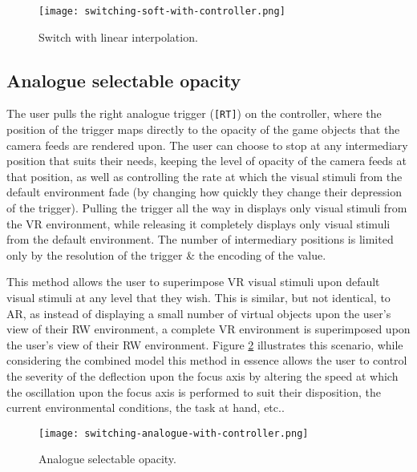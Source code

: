 \begin{figure}[h]
	\begin{center}
		\texttt{[image: switching-soft-with-controller.png]}
		\caption{Switch with linear interpolation.}
		\label{scenario12}
	\end{center}
\end{figure}


\subsection{Analogue selectable opacity}
\label{analogue-selectable-opacity}
The user pulls the right analogue trigger (\texttt{[RT]}) on the controller, where the position of the trigger maps directly to the opacity of the game objects that the camera feeds are rendered upon. The user can choose to stop at any intermediary position that suits their needs, keeping the level of opacity of the camera feeds at that position, as well as controlling the rate at which the visual stimuli from the default environment fade (by changing how quickly they change their depression of the trigger). Pulling the trigger all the way in displays only visual stimuli from the VR environment, while releasing it completely displays only visual stimuli from the default environment. The number of intermediary positions is limited only by the resolution of the trigger \& the encoding of the value.

This method allows the user to superimpose VR visual stimuli upon default visual stimuli at any level that they wish. This is similar, but not identical, to AR, as instead of displaying a small number of virtual objects upon the user's view of their RW environment, a complete VR environment is superimposed upon the user's view of their RW environment. Figure \ref{scenario2} illustrates this scenario, while considering the combined model this method in essence allows the user to control the severity of the deflection upon the focus axis by altering the speed at which the oscillation upon the focus axis is performed to suit their disposition, the current environmental conditions, the task at hand, etc..

\begin{figure}[h]
	\begin{center}
		\texttt{[image: switching-analogue-with-controller.png]}
		\caption{Analogue selectable opacity.}
		\label{scenario2}
	\end{center}
\end{figure}

